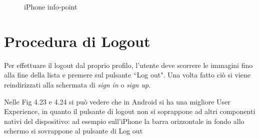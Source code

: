 \begin{figure}[H]
\begin{minipage}[h]{0.47\textwidth}
        \caption{\label{infoPointIphone} iPhone info-point}
    \end{minipage}
\end{figure}

\section{Procedura di Logout}
Per effettuare il logout dal proprio profilo, l'utente deve scorrere le immagini fino alla fine della lista e premere sul pulsante ``Log out". Una volta fatto ci\`o si viene reindirizzati alla schermata di \textit{sign in} o \textit{sign up}.

Nelle Fig 4.23 e 4.24 si pu\`o vedere che in Android si ha una migliore User Experience, in quanto il pulsante di logout non si soprappone ad altri componenti nativi del dispositivo: ad esempio sull'iPhone la barra orizzontale in fondo allo schermo si sovrappone al pulsante di Log out
